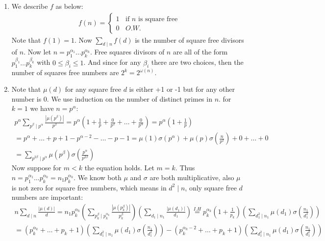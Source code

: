 \begin{enumerate}[label=\ilabel]
    \item 
        We describe $f$ as below:
        \begin{gather*}
            f(n) = \begin{cases}
                1 \ \ \ \ \text{if $n$ is square free} \\
                0 \ \ \ \ O.W.
            \end{cases}
        \end{gather*}
        Note that $f(1) = 1$. Now $\sum_{d \mid n} f(d)$ is the number of square free divisors of $n$. Now let $n = p_1^{\alpha_1} \dots p_k^{\alpha_k}$. Free squares divisors of $n$ are all of the form $p_1^{\beta_1} \dots p_k^{\beta_k}$ with $0 \le \beta_i \le 1$. And since for any $\beta_i$ there are two choices, then the number of squares free numbers are $2^k = 2^{\omega(n)}$.
    \item 
        Note that $\mu(d)$ for any square free $d$ is either +1 or -1 but for any other number is 0. We use induction on the number of distinct primes in $n$. for $k = 1$ we have $n = p^\alpha$:
        \begin{gather*}
            p^\alpha \sum_{p^\beta \mid p^\alpha} \frac{|\mu(p^\beta)|}{p^\beta} = p^\alpha (1 + \frac{1}{p} + \frac{0}{p^2} + \dots + \frac{0}{p^\alpha}) = p^\alpha(1 + \frac{1}{p}) \\
            = p^\alpha + \dots + p + 1 - p^{\alpha - 2} - \dots - p - 1 = \mu(1)\sigma(p^\alpha) + \mu(p) \sigma(\frac{n}{p^2}) + 0 + \dots + 0 \\
            = \sum_{p^{2\beta} \mid p^\alpha} \mu(p^\beta) \sigma(\frac{p^\alpha}{p^{2\beta}})
        \end{gather*}
        Now suppose for $m < k$ the equation holds. Let $m = k$. Thus $n = p_1^{\alpha_1} \dots p_k^{\alpha_k} = n_1 p_k^{\alpha_k}$. We know both $\mu$ and $\sigma$ are both multiplicative, also $\mu$ is not zero for square free numbers, which means in $d^2 \mid n$, only square free $d$ numbers are important:
        \begin{gather*}
            n \sum_{d \mid n} \frac{|\mu(d)|}{d} = n_1 p_k^{\alpha_k} (\sum_{p_k^\beta \mid p_k^{\alpha_k}} \frac{|\mu(p_k^\beta)|}{p_k^\beta})(\sum_{d_1 \mid n_1} \frac{|\mu(d_1)|}{d_1}) \overset{I.H}{=} p_k^{\alpha_k} (1 + \frac{1}{p_k})(\sum_{d_1^2 \mid n_1} \mu(d_1) \sigma(\frac{n_1}{d_1^2})) \\
            = (p_k^{\alpha_k} + \dots + p_k + 1)(\sum_{d_1^2 \mid n_1} \mu(d_1) \sigma(\frac{n_1}{d_1^2})) - (p_k^{\alpha_k - 2} + \dots + p_k + 1) (\sum_{d_1^2 \mid n_1} \mu(d_1) \sigma(\frac{n_1}{d_1^2})) \\

\end{gather*}
\end{enumerate}
